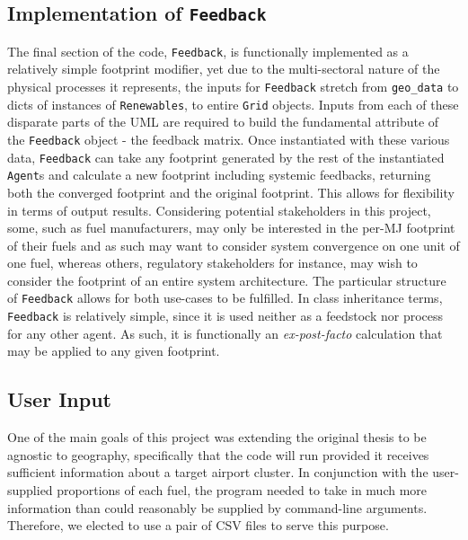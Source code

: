 \documentclass{article}
\begin{document}
\subsection*{Implementation of \texttt{Feedback}}
The final section of the code, \texttt{Feedback}, is functionally implemented as a relatively simple footprint modifier, yet due to the multi-sectoral nature of the physical processes it represents, the inputs for \texttt{Feedback} stretch from \texttt{geo\_data} to dicts of instances of \texttt{Renewables}, to entire \texttt{Grid} objects. Inputs from each of these disparate parts of the UML are required to build the fundamental attribute of the \texttt{Feedback} object - the feedback matrix. Once instantiated with these various data, \texttt{Feedback} can take any footprint generated by the rest of the instantiated \texttt{Agent}s and calculate a new footprint including systemic feedbacks, returning both the converged footprint and the original footprint. This allows for flexibility in terms of output results. Considering potential stakeholders in this project, some, such as fuel manufacturers, may only be interested in the per-MJ footprint of their fuels and as such may want to consider system convergence on one unit of one fuel, whereas others, regulatory stakeholders for instance, may wish to consider the footprint of an entire system architecture. The particular structure of \texttt{Feedback} allows for both use-cases to be fulfilled. In class inheritance terms, \texttt{Feedback} is relatively simple, since it is used neither as a feedstock nor process for any other agent. As such, it is functionally an \textit{ex-post-facto} calculation that may be applied to any given footprint.

\subsection*{User Input}
One of the main goals of this project was extending the original thesis to be agnostic to geography, specifically that the code will run provided it receives sufficient information about a target airport cluster. In conjunction with the user-supplied proportions of each fuel, the program needed to take in much more information than could reasonably be supplied by command-line arguments. Therefore, we elected to use a pair of CSV files to serve this purpose. \par
\end{document}
